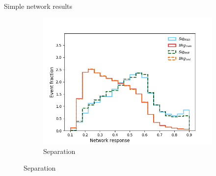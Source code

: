 \documentclass[10pt, UKenglish]{beamer}
\begin{document}
\begin{frame}{Simple network results}
\vspace{-2mm}
\begin{figure}[htbp]
    \centering
    \begin{subfigure}[b]{0.4\textwidth}
        \includegraphics[width=\textwidth]{standard_separation}
        \caption{Separation}
        \label{fig:simple:final:sepa}
    \end{subfigure}
\quad


\end{figure}
\end{frame}
\end{document}
